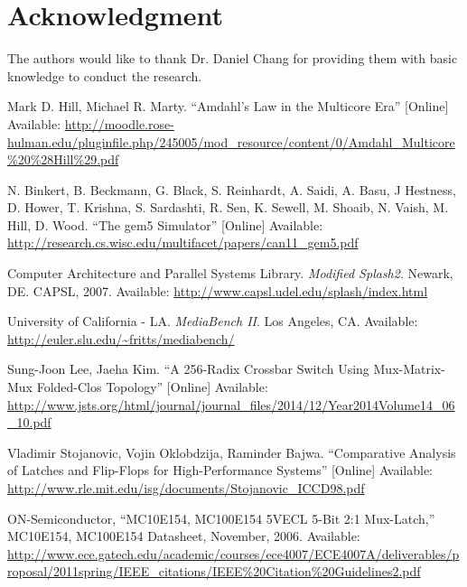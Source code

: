\documentclass[journal]{IEEEtran}
\begin{document}
\section*{Acknowledgment}
The authors would like to thank Dr. Daniel Chang for providing them with basic knowledge to conduct the research.

\begin{thebibliography}{1}
    Mark D. Hill, Michael R. Marty. ``Amdahl’s Law in the Multicore Era'' [Online]
    Available: \url{http://moodle.rose-hulman.edu/pluginfile.php/245005/mod_resource/content/0/Amdahl_Multicore%20%28Hill%29.pdf}

    N. Binkert, B. Beckmann, G. Black, S. Reinhardt, A. Saidi, A. Basu, J Hestness, D. Hower, T. Krishna, S. Sardashti, R. Sen, K. Sewell, M. Shoaib, N. Vaish, M. Hill, D. Wood. ``The gem5 Simulator'' [Online]
    Available: \url{http://research.cs.wisc.edu/multifacet/papers/can11_gem5.pdf}

    Computer Architecture and Parallel Systems Library. \textit{Modified Splash2}. Newark, DE. CAPSL, 2007.
    Available: \url{http://www.capsl.udel.edu/splash/index.html}

    University of California - LA. \textit{MediaBench II}. Los Angeles, CA.
    Available: \url{http://euler.slu.edu/~fritts/mediabench/}

    Sung-Joon Lee, Jaeha Kim. ``A 256-Radix Crossbar Switch Using Mux-Matrix-Mux Folded-Clos Topology'' [Online]
    Available: \url{http://www.jsts.org/html/journal/journal_files/2014/12/Year2014Volume14_06_10.pdf}

    Vladimir Stojanovic, Vojin Oklobdzija, Raminder Bajwa. ``Comparative Analysis of Latches and Flip-Flops for High-Performance Systems'' [Online]
    Available: \url{http://www.rle.mit.edu/isg/documents/Stojanovic_ICCD98.pdf}

    ON-Semiconductor, ``MC10E154, MC100E154 5VECL 5-Bit 2:1 Mux-Latch,'' MC10E154, MC100E154 Datasheet, November, 2006.
    Available: \url{http://www.ece.gatech.edu/academic/courses/ece4007/ECE4007A/deliverables/proposal/2011spring/IEEE_citations/IEEE%20Citation%20Guidelines2.pdf}
\end{thebibliography}
\end{document}
